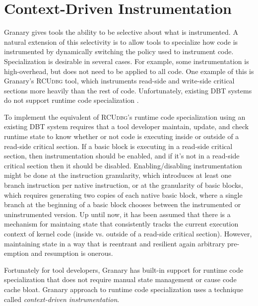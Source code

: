 \documentclass[preprint]{sigplanconf}
\newcommand{\toolname}[1]{{\scshape #1}}
\begin{document}
\section{Context-Driven Instrumentation}\label{sec:how}

Granary gives tools the ability to be selective about what is instrumented. A natural extension of this selectivity is to allow tools to specialize how code is instrumented by dynamically switching the policy used to instrument code. Specialization is desirable in several cases. For example, some instrumentation is high-overhead, but does not need to be applied to all code. One example of this is Granary's \toolname{RCUdbg} tool, which instruments read-side and write-side critical sections more heavily than the rest of code. Unfortunately, existing DBT systems do not support runtime code specialization \cite{DRK,btkernel,Pin,DynamoRIO}. 

To implement the equivalent of \toolname{RCUdbg}'s runtime code specialization using an existing DBT system requires that a tool developer maintain, update, and check runtime state to know whether or not code is executing inside or outside of a read-side critical section. If a basic block is executing in a read-side critical section, then instrumentation should be enabled, and if it's not in a read-side critical section then it should be disabled. Enabling/disabling instrumentation might be done at the instruction granularity, which introduces at least one branch instruction per native instruction, or at the granularity of basic blocks, which requires generating two copies of each native basic block, where a single branch at the beginning of a basic block chooses between the instrumented or uninstrumented version. Up until now, it has been assumed that there is a mechanism for maintaing state that consistently tracks the current execution context of kernel code (inside vs. outside of a read-side critical section). However, maintaining state in a way that is reentrant and resilient again arbitrary pre-emption and resumption is onerous.


Fortunately for tool developers, Granary has built-in support for runtime code specialization that does not require manual state management or cause code cache bloat. Granary approach to runtime code specialization uses a technique called \emph{context-driven instrumentation}.

\end{document}
